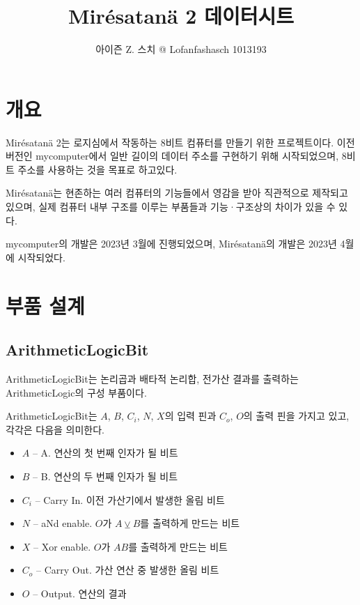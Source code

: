 \documentclass{article}
\title{Mirésatanä 2 데이터시트}
\author{아이즌 Z. 스치 @ Lofanfashasch 1013193}
\begin{document}
\maketitle
\tableofcontents

\pagebreak

\section{개요}

Mirésatanä 2는 로지심에서 작동하는 8비트 컴퓨터를 만들기 위한 프로젝트이다.
이전 버전인 mycomputer에서 일반 길이의 데이터 주소를 구현하기 위해 시작되었으며,
8비트 주소를 사용하는 것을 목표로 하고있다.

Mirésatanä는 현존하는 여러 컴퓨터의 기능들에서 영감을 받아
직관적으로 제작되고 있으며, 실제 컴퓨터 내부 구조를 이루는 부품들과
기능·구조상의 차이가 있을 수 있다.

mycomputer의 개발은 2023년 3월에 진행되었으며,
Mirésatanä의 개발은 2023년 4월에 시작되었다.

\section{부품 설계}

\subsection{ArithmeticLogicBit}

ArithmeticLogicBit는 논리곱과 배타적 논리합,
전가산 결과를 출력하는 ArithmeticLogic의 구성 부품이다.

ArithmeticLogicBit는
$A$, $B$, $C_i$, $N$, $X$의 입력 핀과
$C_o$, $O$의 출력 핀을 가지고 있고,
각각은 다음을 의미한다.

\begin{itemize}
    \item $A$ -- A. 연산의 첫 번째 인자가 될 비트
    \item $B$ -- B. 연산의 두 번째 인자가 될 비트
    \item $C_i$ -- Carry In. 이전 가산기에서 발생한 올림 비트
    \item $N$ -- aNd enable. $O$가 $A \veebar B$를 출력하게 만드는 비트
    \item $X$ -- Xor enable. $O$가 $AB$를 출력하게 만드는 비트
    \item $C_o$ -- Carry Out. 가산 연산 중 발생한 올림 비트
    \item $O$ -- Output. 연산의 결과
\end{itemize}
\end{document}
